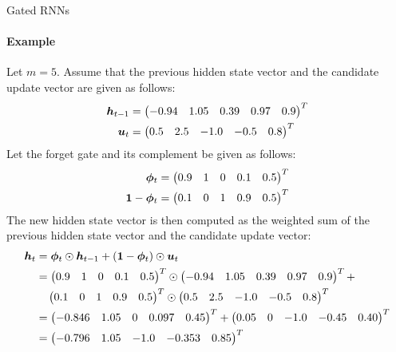\begin{frame}{Gated RNNs}
\framesubtitle{Example}
    Let $m=5$. Assume that the previous hidden state vector and the 
    candidate update vector are given as follows:
    \begin{align*}
        {\boldsymbol h}_{t-1} &= \begin{pmatrix} -0.94 & 1.05 & 0.39 & 0.97 & 0.9 \end{pmatrix}^T\\
        {\boldsymbol u}_t & = \begin{pmatrix} 0.5 & 2.5 & -1.0 & -0.5 & 0.8 \end{pmatrix}^T
    \end{align*}
    Let the forget gate and its complement be given as follows:
    \begin{align*}
        {\bm \phi}_t& =  \begin{pmatrix} 0.9 & 1& 0 & 0.1 & 0.5 \end{pmatrix}^T\\
        \mathbf{1}-{\bm \phi}_t& =  \begin{pmatrix} 0.1 & 0& 1 & 0.9 & 0.5 \end{pmatrix}^T
    \end{align*}
    The new hidden state vector is then computed as the weighted sum of
    the previous hidden state vector and the candidate update vector:
    \begin{align*}
    {\boldsymbol h}_t & = {\bm \phi}_t \odot {\boldsymbol h}_{t-1} + (\mathbf{1} -{\bm \phi}_t) \odot {\boldsymbol u}_t\\
              & = \begin{pmatrix} 0.9 & 1& 0 & 0.1 & 0.5 \end{pmatrix}^T \odot 
              \begin{pmatrix} -0.94 & 1.05  & 0.39 & 0.97 & 0.9 \end{pmatrix}^T +\\
              & \quad \begin{pmatrix} 0.1 & 0& 1 & 0.9 & 0.5 \end{pmatrix}^T \odot 
              \begin{pmatrix} 0.5 & 2.5 & -1.0 & -0.5 & 0.8 \end{pmatrix}^T\\
                & = 
                \begin{pmatrix} -0.846 & 1.05 & 0 & 0.097 & 0.45 \end{pmatrix}^T +
                \begin{pmatrix} 0.05 & 0 & -1.0 & -0.45 & 0.40 \end{pmatrix}^T\\
                & =\begin{pmatrix} -0.796 & 1.05 & -1.0 & -0.353 & 0.85 \end{pmatrix}^T
    \end{align*}
\end{frame}
%
%
